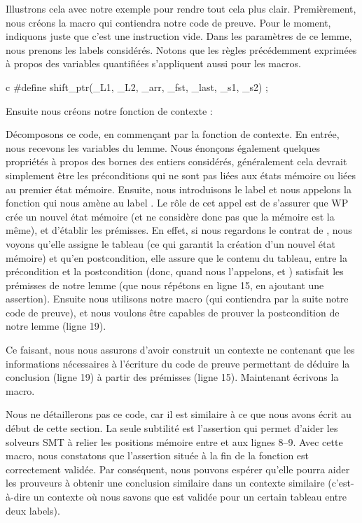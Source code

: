 Illustrons cela avec notre exemple pour rendre tout cela plus clair.
Premièrement, nous créons la macro  qui contiendra notre
code de preuve. Pour le moment, indiquons juste que c'est une instruction vide.
Dans les paramètres de ce lemme, nous prenons les labels considérés. Notons que
les règles précédemment exprimées à propos des variables quantifiées s'appliquent
aussi pour les macros.


\begin{CodeBlock}{c}
#define shift_ptr(_L1, _L2, _arr, _fst, _last, _s1, _s2) ;
\end{CodeBlock}


Ensuite nous créons notre fonction de contexte :




Décomposons ce code, en commençant par la fonction de contexte. En entrée, nous
recevons les variables du lemme. Nous énonçons également quelques propriétés à
propos des bornes des entiers considérés, généralement cela devrait simplement
être les préconditions qui ne sont pas liées aux états mémoire ou liées au
premier état mémoire. Ensuite, nous introduisons le label  et nous
appelons la fonction  qui nous amène au label
. Le rôle de cet appel est de s'assurer que WP crée un nouvel
état mémoire (et ne considère donc pas que la mémoire est la même), et
d'établir les prémisses. En effet, si nous regardons le contrat de
, nous voyons qu'elle assigne le tableau (ce qui
garantit la création d'un nouvel état mémoire) et qu'en postcondition, elle assure
que le contenu du tableau, entre la précondition et la postcondition (donc, quand nous
l'appelons,  et ) satisfait les prémisses de notre
lemme (que nous répétons en ligne 15, en ajoutant une assertion). Ensuite nous
utilisons notre macro  (qui contiendra par la suite notre
code de preuve), et nous voulons être capables de prouver la postcondition de
notre lemme (ligne 19).


Ce faisant, nous nous assurons d'avoir construit un contexte ne
contenant que les informations nécessaires à l'écriture du code de preuve
permettant de déduire la conclusion (ligne 19) à partir des prémisses (ligne 15).
Maintenant écrivons la macro.




Nous ne détaillerons pas ce code, car il est similaire à ce que nous avons
écrit au début de cette section. La seule subtilité est l'assertion qui
permet d'aider les solveurs SMT à relier les positions mémoire entre
 et  aux lignes 8--9. Avec cette macro, nous
constatons que l'assertion située à la fin de la fonction
 est correctement validée. Par
conséquent, nous pouvons espérer qu'elle pourra aider les prouveurs à
obtenir une conclusion similaire dans un contexte similaire (c'est-à-dire un
contexte où nous savons que  est validée pour un certain
tableau entre deux labels).


